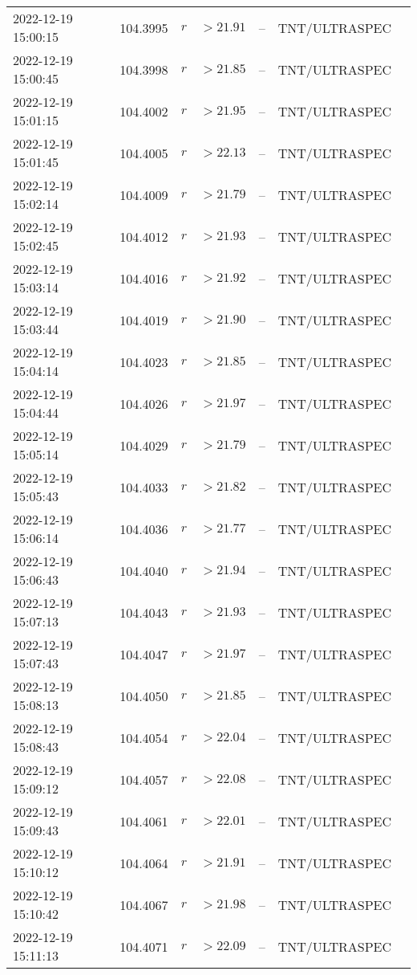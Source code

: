 \documentclass{nature_plusfigure}
\begin{document}
\begin{supplement}
\begin{center}
\begin{longtable}{lllllll}
2022-12-19 15:00:15 & 104.3995 & $r$ & $>21.91$ & -- & TNT/ULTRASPEC &  \\ 
2022-12-19 15:00:45 & 104.3998 & $r$ & $>21.85$ & -- & TNT/ULTRASPEC &  \\ 
2022-12-19 15:01:15 & 104.4002 & $r$ & $>21.95$ & -- & TNT/ULTRASPEC &  \\ 
2022-12-19 15:01:45 & 104.4005 & $r$ & $>22.13$ & -- & TNT/ULTRASPEC &  \\ 
2022-12-19 15:02:14 & 104.4009 & $r$ & $>21.79$ & -- & TNT/ULTRASPEC &  \\ 
2022-12-19 15:02:45 & 104.4012 & $r$ & $>21.93$ & -- & TNT/ULTRASPEC &  \\ 
2022-12-19 15:03:14 & 104.4016 & $r$ & $>21.92$ & -- & TNT/ULTRASPEC &  \\ 
2022-12-19 15:03:44 & 104.4019 & $r$ & $>21.90$ & -- & TNT/ULTRASPEC &  \\ 
2022-12-19 15:04:14 & 104.4023 & $r$ & $>21.85$ & -- & TNT/ULTRASPEC &  \\ 
2022-12-19 15:04:44 & 104.4026 & $r$ & $>21.97$ & -- & TNT/ULTRASPEC &  \\ 
2022-12-19 15:05:14 & 104.4029 & $r$ & $>21.79$ & -- & TNT/ULTRASPEC &  \\ 
2022-12-19 15:05:43 & 104.4033 & $r$ & $>21.82$ & -- & TNT/ULTRASPEC &  \\ 
2022-12-19 15:06:14 & 104.4036 & $r$ & $>21.77$ & -- & TNT/ULTRASPEC &  \\ 
2022-12-19 15:06:43 & 104.4040 & $r$ & $>21.94$ & -- & TNT/ULTRASPEC &  \\ 
2022-12-19 15:07:13 & 104.4043 & $r$ & $>21.93$ & -- & TNT/ULTRASPEC &  \\ 
2022-12-19 15:07:43 & 104.4047 & $r$ & $>21.97$ & -- & TNT/ULTRASPEC &  \\ 
2022-12-19 15:08:13 & 104.4050 & $r$ & $>21.85$ & -- & TNT/ULTRASPEC &  \\ 
2022-12-19 15:08:43 & 104.4054 & $r$ & $>22.04$ & -- & TNT/ULTRASPEC &  \\ 
2022-12-19 15:09:12 & 104.4057 & $r$ & $>22.08$ & -- & TNT/ULTRASPEC &  \\ 
2022-12-19 15:09:43 & 104.4061 & $r$ & $>22.01$ & -- & TNT/ULTRASPEC &  \\ 
2022-12-19 15:10:12 & 104.4064 & $r$ & $>21.91$ & -- & TNT/ULTRASPEC &  \\ 
2022-12-19 15:10:42 & 104.4067 & $r$ & $>21.98$ & -- & TNT/ULTRASPEC &  \\ 
2022-12-19 15:11:13 & 104.4071 & $r$ & $>22.09$ & -- & TNT/ULTRASPEC &  \\ 

\end{longtable}
\end{center}
\end{supplement}
\end{document}

